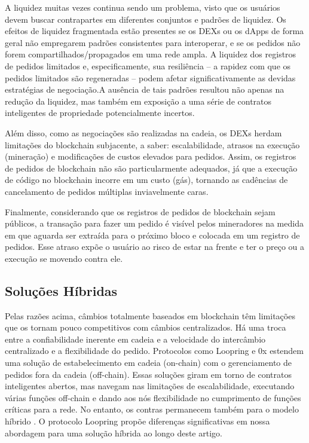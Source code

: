 \documentclass[UTF8,nofonts]{article}
\begin{document}
\begin{multicols}{2}
A liquidez muitas vezes continua sendo um problema, visto que os usuários devem buscar contrapartes em diferentes conjuntos e padrões de liquidez. Os efeitos de liquidez fragmentada estão presentes se os DEXs ou os dApps de forma geral não empregarem padrões consistentes para interoperar, e se os pedidos não forem compartilhados/propagados em uma rede ampla. A liquidez dos registros de pedidos limitados e, especificamente, sua resiliência -- a rapidez com que os pedidos limitados são regeneradas -- podem afetar significativamente as devidas estratégias de negociação\cite{limitorderliquidity}.A ausência de tais padrões resultou não apenas na redução da liquidez, mas também em exposição a uma série de contratos inteligentes de propriedade potencialmente incertos. 


Além disso, como as negociações são realizadas na cadeia, os DEXs herdam limitações do blockchain subjacente, a saber: escalabilidade, atrasos na execução (mineração) e modificações de custos elevados para pedidos. Assim, os registros de pedidos de blockchain não são particularmente adequados, já que a execução de código no blockchain incorre em um custo (gás), tornando as cadências de cancelamento de pedidos múltiplas inviavelmente caras. 

Finalmente, considerando que os registros de pedidos de blockchain sejam públicos, a transação para fazer um pedido é visível pelos mineradores na medida em que aguarda ser extraída para o próximo bloco e colocada em um registro de pedidos. Esse atraso expõe o usuário ao risco de estar na frente e ter o preço ou a execução se movendo contra ele.


\subsection{Soluções Híbridas}
Pelas razões acima, câmbios totalmente baseados em blockchain têm limitações que os tornam pouco competitivos com câmbios centralizados. Há uma troca entre a confiabilidade inerente em cadeia e a velocidade do intercâmbio centralizado e a flexibilidade do pedido. Protocolos como Loopring e 0x  \cite{warren20170x} estendem uma solução de estabelecimento em cadeia (on-chain) com o gerenciamento de pedidos fora da cadeia (off-chain). Essas soluções giram em torno de contratos inteligentes abertos, mas navegam nas limitações de escalabilidade, executando várias funções off-chain e dando aos nós flexibilidade no cumprimento de funções críticas para a rede. No entanto, os contras permanecem também para o modelo híbrido \cite{costofdecent}. O protocolo Loopring propõe diferenças significativas em nossa abordagem para uma solução híbrida ao longo deste artigo.


\end{multicols}
\end{document}
